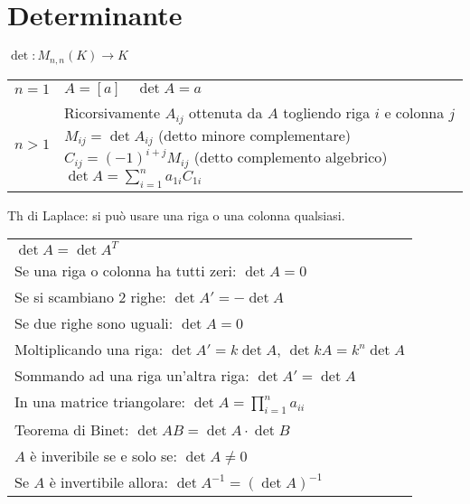 \section{Determinante}
$\det: M_{n,n}(K) \rightarrow K$

\begin{tabularx}{\textwidth}{lX}
	$n = 1$ & $A = [a] \quad \det{A} = a$ \\
	$n > 1$ &
	Ricorsivamente \newline
	$A_{ij}$ ottenuta da $A$ togliendo riga $i$ e colonna $j$ \newline
	$M_{ij} = \det A_{ij}$ (detto minore complementare) \newline
	$C_{ij} = (-1)^{i+j}M_{ij}$ (detto complemento algebrico) \newline
	$\det A = \sum_{i=1}^{n} a_{1i}C_{1i}$ \\
\end{tabularx}

Th di Laplace: si può usare una riga o una colonna qualsiasi.

\begin{tabular}{l}
	$\det A = \det A^T$ \\
	Se una riga o colonna ha tutti zeri: $\det A = 0$ \\
	Se si scambiano 2 righe: $\det A' = -\det A$ \\
	Se due righe sono uguali: $\det A = 0$ \\
	Moltiplicando una riga: $\det A' = k\det A$, $\det kA = k^n\det A$ \\
	Sommando ad una riga un'altra riga: $\det A' = \det A$ \\
	In una matrice triangolare: $\det A = \prod_{i=1}^{n} a_{ii}$ \\
	Teorema di Binet: $\det AB = \det A \cdot \det B$ \\
	$A$ è inveribile se e solo se: $\det A \neq 0$ \\
	Se $A$ è invertibile allora: $\det A^{-1} = (\det A)^{-1}$ \\
\end{tabular}
